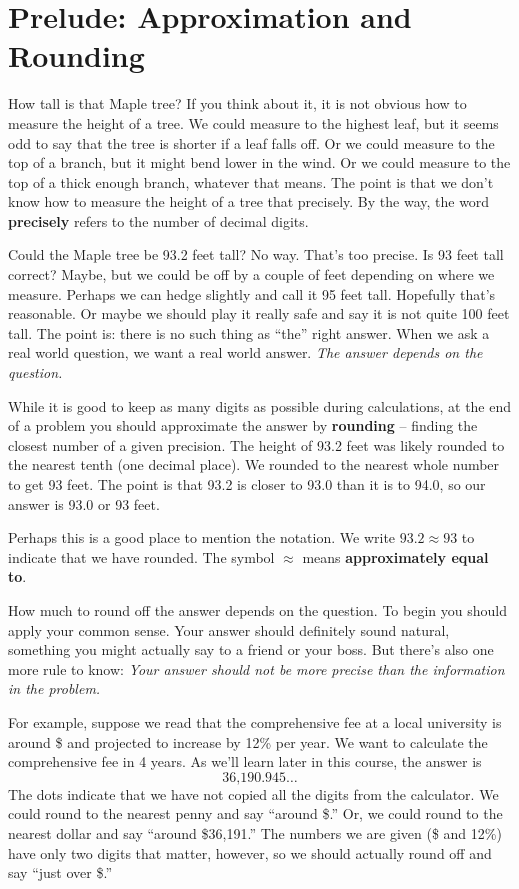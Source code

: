 
\section{Prelude: Approximation and Rounding} 

How tall is that Maple tree?  If you think about it, it is not obvious how to measure the height of a tree. We could measure to the highest leaf, but it seems odd to say that the tree is shorter if a leaf falls off.  Or we could measure to the top of a branch, but it might bend lower in the wind.  Or we could measure to the top of a thick enough branch, whatever that means.  The point is that we don't know how to measure the height of a tree that precisely.  By the way, the word \textbf{precisely} refers to the number of decimal digits.

Could the Maple tree be 93.2 feet tall?  No way.  That's too precise.  Is 93 feet tall correct?  Maybe, but we could be off by a couple of feet depending on where we measure. Perhaps we can hedge %
slightly and call it 95 feet tall.  Hopefully that's reasonable.  Or maybe we should play it really safe and say it is not quite 100 feet tall.  The point is: there is no such thing as ``the'' right answer.  When we ask a real world question, we want a real world answer. \emph{The answer depends on the question.} 

While it is good to keep as many digits as possible during calculations, at the end of a problem you should approximate the answer by \textbf{rounding} -- finding the closest number of a given precision.  The height of 93.2 feet was likely rounded to the nearest tenth (one decimal place).  We rounded to the nearest whole number to get 93 feet.  The point is that 93.2 is closer to 93.0 than it is to 94.0, so our answer is 93.0 or 93 feet.


Perhaps this is a good place to mention the notation.  We write $93.2 \approx 93$ to indicate that we have rounded.  The symbol $\approx$ means \textbf{approximately equal to}.

How much to round off the answer depends on the question.  To begin you should apply your common sense.  Your answer should definitely sound natural, something you might actually say to a friend or your boss.  But there's also one more rule to know: 
\emph{Your answer should not be more precise than the information in the problem.}

For example, suppose we read that the comprehensive fee at a local university is around \$ and projected to increase by 12\% per year.  We want to calculate the comprehensive fee in 4 years.  As we'll learn later in this course, the answer is 
$$\text{36,190.945}\ldots$$
The dots indicate that we have not copied all the digits from the calculator.
We could round to the nearest penny and say ``around \$.''  Or, we could round to the nearest dollar and say ``around \$36,191.'' The numbers we are given (\$ and 12\%) have only two digits that matter, however, so we should actually round off and say ``just over \$.'' 

